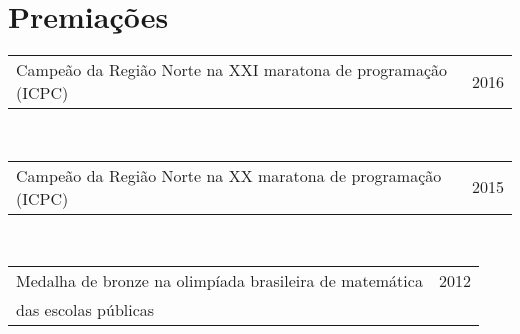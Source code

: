 \section{Premiações}

\begin{tabular}{p{11cm}|r}
  Campeão da Região Norte na XXI maratona de programação (ICPC) & \textsc{2016} \\
\end{tabular}\\

\begin{tabular}{p{11cm}|r}
  Campeão da Região Norte na XX maratona de programação (ICPC) & \textsc{2015} \\
\end{tabular}\\

\begin{tabular}{p{11cm}|r}
  Medalha de bronze na olimpíada brasileira de matemática & \textsc{2012} \\
  das escolas públicas &  \\
\end{tabular}\\
